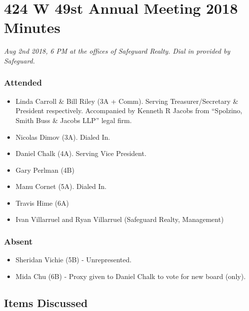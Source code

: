 



\section*{424 W 49st Annual Meeting 2018 Minutes}

\textit{Aug 2nd 2018, 6 PM at the offices of Safeguard Realty. Dial in provided by 
Safeguard.}

\subsubsection*{Attended}

\begin{itemize}
\item Linda Carroll \& Bill Riley (3A + Comm).  Serving Treasurer/Secretary \& President 
respectively. Accompanied by Kenneth R Jacobs from “Spolzino, Smith Buss \& Jacobs LLP” legal 
firm.

\item Nicolas Dimov (3A).  Dialed In.

\item Daniel Chalk (4A).  Serving Vice President.

\item Gary Perlman (4B)

\item Manu Cornet (5A).  Dialed In.

\item Travis Hime (6A)

\item Ivan Villarruel and Ryan Villarruel (Safeguard Realty, Management)

\end{itemize}

\subsubsection*{Absent}

\begin{itemize}
\item Sheridan Vichie (5B) - Unrepresented.
\item Mida Chu (6B) - Proxy given to Daniel Chalk to vote for new board (only).
\end{itemize}

\subsection*{Items Discussed}

